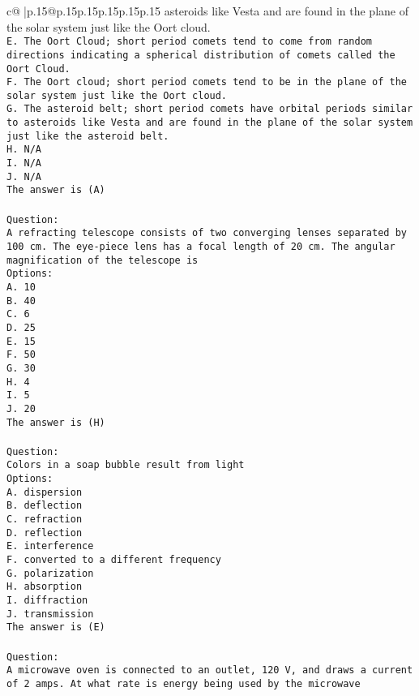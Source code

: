 \documentclass{article}
\begin{document}
{\begin{supertabular}{c@{$\;$}|p{.15\linewidth}@{}p{.15\linewidth}p{.15\linewidth}p{.15\linewidth}p{.15\linewidth}p{.15\linewidth}}
{{{asteroids like Vesta and are found in the plane of the solar system just like the Oort cloud.\\ \tt E. The Oort Cloud; short period comets tend to come from random directions indicating a spherical distribution of comets called the Oort Cloud.\\ \tt F. The Oort cloud; short period comets tend to be in the plane of the solar system just like the Oort cloud.\\ \tt G. The asteroid belt; short period comets have orbital periods similar to asteroids like Vesta and are found in the plane of the solar system just like the asteroid belt.\\ \tt H. N/A\\ \tt I. N/A\\ \tt J. N/A\\ \tt The answer is (A)\\ \tt \\ \tt Question:\\ \tt A refracting telescope consists of two converging lenses separated by 100 cm. The eye-piece lens has a focal length of 20 cm. The angular magnification of the telescope is\\ \tt Options:\\ \tt A. 10\\ \tt B. 40\\ \tt C. 6\\ \tt D. 25\\ \tt E. 15\\ \tt F. 50\\ \tt G. 30\\ \tt H. 4\\ \tt I. 5\\ \tt J. 20\\ \tt The answer is (H)\\ \tt \\ \tt Question:\\ \tt Colors in a soap bubble result from light\\ \tt Options:\\ \tt A. dispersion\\ \tt B. deflection\\ \tt C. refraction\\ \tt D. reflection\\ \tt E. interference\\ \tt F. converted to a different frequency\\ \tt G. polarization\\ \tt H. absorption\\ \tt I. diffraction\\ \tt J. transmission\\ \tt The answer is (E)\\ \tt \\ \tt Question:\\ \tt A microwave oven is connected to an outlet, 120 V, and draws a current of 2 amps. At what rate is energy being used by the microwave }}}
\end{supertabular}}
\end{document}
